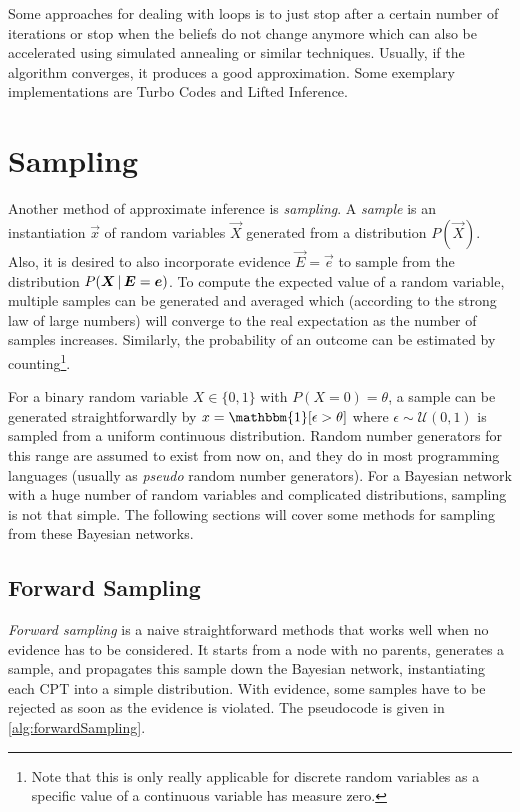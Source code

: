 			Some approaches for dealing with loops is to just stop after a certain number of iterations or stop when the beliefs do not change anymore which can also be accelerated using simulated annealing or similar techniques. Usually, if the algorithm converges, it produces a good approximation. Some exemplary implementations are Turbo Codes and Lifted Inference.

	\section{Sampling}
		Another method of approximate inference is \emph{sampling}. A \emph{sample} is an instantiation \(\vec{x}\) of random variables \(\vec{X}\) generated from a distribution \(P(\vec{X})\). Also, it is desired to also incorporate evidence \(\vec{E} = \vec{e}\) to sample from the distribution \( P(\bm{X} \,\vert\, \bm{E} = \bm{e}) \). To compute the expected value of a random variable, multiple samples can be generated and averaged which (according to the strong law of large numbers) will converge to the real expectation as the number of samples increases. Similarly, the probability of an outcome can be estimated by counting\footnote{Note that this is only really applicable for discrete random variables as a specific value of a continuous variable has measure zero.}.

		For a binary random variable \( X \in \{ 0, 1 \} \) with \( P(X = 0) = \theta \), a sample can be generated straightforwardly by \( x = \mathbbm{1}[\epsilon > \theta] \) where \( \epsilon \sim \mathcal{U}(0, 1) \) is sampled from a uniform continuous distribution. Random number generators for this range are assumed to exist from now on, and they do in most programming languages (usually as \emph{pseudo} random number generators). For a Bayesian network with a huge number of random variables and complicated distributions, sampling is not that simple. The following sections will cover some methods for sampling from these Bayesian networks.

		\subsection{Forward Sampling}
			\emph{Forward sampling} is a naive straightforward methods that works well when no evidence has to be considered. It starts from a node with no parents, generates a sample, and propagates this sample down the Bayesian network, instantiating each CPT into a simple distribution. With evidence, some samples have to be rejected as soon as the evidence is violated. The pseudocode is given in \autoref{alg:forwardSampling}.

